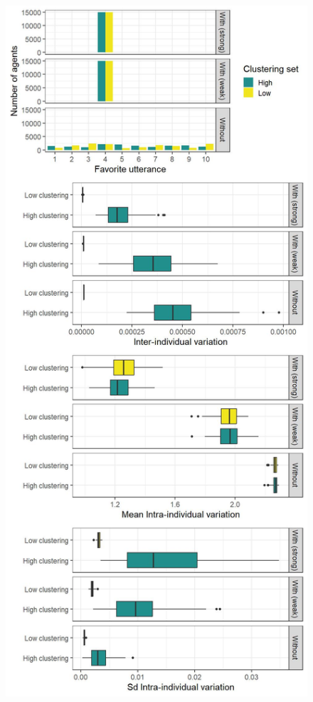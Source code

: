 \documentclass[
]{article}
\begin{document}
\begin{figure}[!H]

{\centering \includegraphics{./Figures/unnamed-chunk-23-1} 

}


\end{figure}
\end{document}
